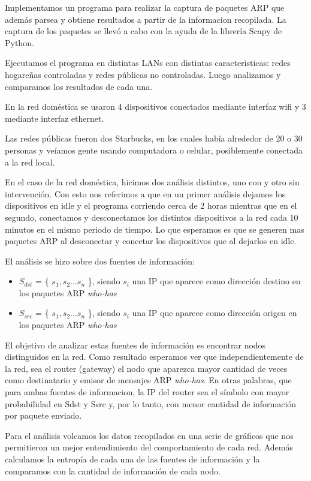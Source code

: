 Implementamos un programa para realizar la captura de paquetes ARP que además parsea y obtiene resultados a partir de la informacion recopilada. La captura de los paquetes se llevó a cabo con la ayuda de la librería Scapy de Python.

Ejecutamos el programa en distintas LANs con distintas caracteristicas: redes hogare\~nas controladas y redes públicas no controladas. Luego analizamos y comparamos los resultados de cada una.\

En la red doméstica se usaron 4 dispositivos conectados mediante interfaz wifi y 3 mediante interfaz ethernet.

Las redes públicas fueron dos Starbucks, en los cuales había alrededor de 20 o 30 personas y veíamos gente usando computadora o celular, posiblemente conectada a la red local.

En el caso de la red doméstica, hicimos dos análisis distintos, uno con y otro sin intervención. Con esto nos referimos a que en un primer análisis dejamos los dispositivos en idle y el programa corriendo cerca de 2 horas mientras
que en el segundo, conectamos y desconectamos los distintos dispositivos a la red cada 10 minutos en el mismo periodo de tiempo. Lo que esperamos es que se generen mas paquetes ARP al desconectar y conectar los dispositivos que al dejarlos en idle.

El análisis se hizo sobre dos fuentes de información:

\begin{itemize}
\item $S_{dst}$ = \{ $s_{1},s_{2} \ldots s_{n} $ \}, siendo $s_{i}$ una IP que aparece como dirección destino en los paquetes
ARP \emph{who-has}
\item $S_{src}$ = \{ $s_{1},s_{2} \ldots s_{n} $ \}, siendo $s_{i}$ una IP que aparece como dirección origen en los paquetes
ARP \emph{who-has}
\end{itemize}

El objetivo de analizar estas fuentes de información es encontrar nodos distinguidos en la red. Como resultado esperamos ver que independientemente de la red, sea el router (gateway) el nodo que aparezca mayor cantidad de veces como destinatario y 
emisor de mensajes ARP \emph{who-has}.
En otras palabras, que para ambas fuentes de informacion, la IP del router sea el símbolo con mayor probabilidad en Sdst y Ssrc y, por lo tanto, con menor cantidad de información por paquete enviado.

Para el análisis volcamos los datos recopilados en una serie de gráficos que nos permitieron un mejor entendimiento del comportamiento de cada red. Además calculamos la entropía de cada una de las fuentes de información y la comparamos con la cantidad de información de cada nodo.
